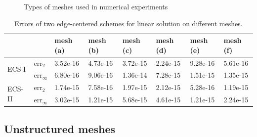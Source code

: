 \documentclass[times,review,preprint]{elsarticle}
\begin{document}
\begin{figure}[h]
\caption{Types of meshes used in numerical experiments}
\label{fig:mesh}
\end{figure}

\begin{table}[h]
\centering
\begin{tabular}{llllllll}
\hline
& & mesh (a) & mesh (b) & mesh (c) & mesh (d) & mesh (e) & mesh (f) \\
\hline
\multirow{2}{*}{ECS-I} & $\text{err}_{2}$ & 3.52e-16 & 4.73e-16 & 3.72e-15 & 2.24e-15 & 9.28e-16 & 5.61e-16 \\
& $\text{err}_{\infty}$ & 6.80e-16 & 9.06e-16 & 1.36e-14 & 7.28e-15 & 1.51e-15 & 1.35e-15 \\
\hline
\multirow{2}{*}{ECS-II} & $\text{err}_{2}$ & 1.74e-15 & 7.58e-16 & 1.97e-15 & 2.12e-15 & 5.28e-16 & 1.19e-15 \\
& $\text{err}_{\infty}$ & 3.02e-15 & 1.21e-15 & 5.68e-15 & 4.61e-15 & 1.21e-15 & 2.24e-15 \\
\hline
\end{tabular}
\caption{Errors of two edge-centered schemes for linear solution on different meshes.}
\label{tab:linear}
\end{table}

\subsection{Unstructured meshes}
\end{document}
